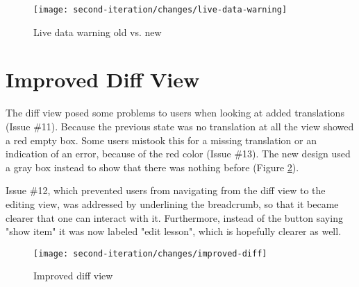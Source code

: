 


\begin{figure}[h!]
 \centering
 \texttt{[image: second-iteration/changes/live-data-warning]}
 \caption{Live data warning old vs. new}
 \label{fig:live-data-warning}
\end{figure}


\section{Improved Diff View}
The diff view posed some problems to users when looking at added translations (Issue \#11). Because the previous state was no translation at all the view showed a red empty box. Some users mistook this for a missing translation or an indication of an error, because of the red color (Issue \#13). The new design used a gray box instead to show that there was nothing before (Figure \ref{fig:improved-diff-view}).

Issue \#12, which prevented users from navigating from the diff view to the editing view, was addressed by underlining the breadcrumb, so that it became clearer that one can interact with it. Furthermore, instead of the button saying "show item" it was now labeled "edit lesson", which is hopefully clearer as well.

\begin{figure}[h!]
 \centering
 \texttt{[image: second-iteration/changes/improved-diff]}
 \caption{Improved diff view}
 \label{fig:improved-diff-view}
\end{figure}

